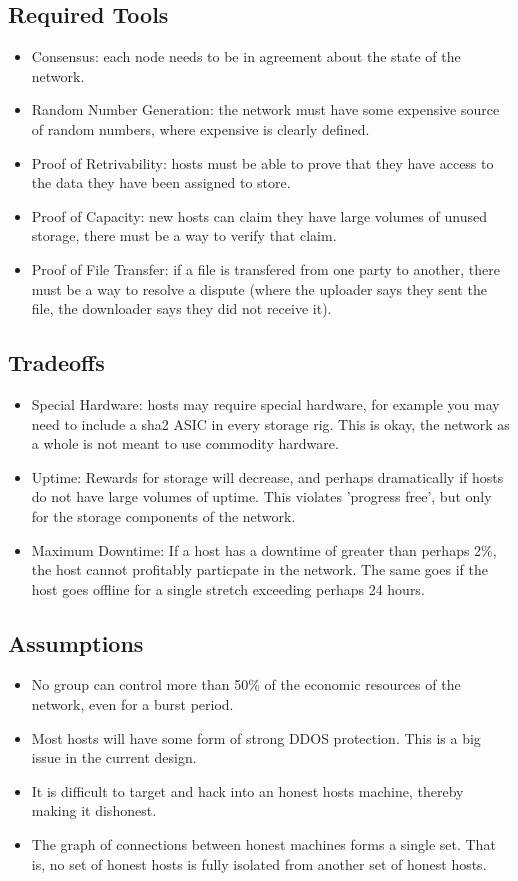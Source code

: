 \documentclass[twocolumn]{article}
\begin{document}
\subsection{Required Tools}
\begin{itemize}
	\item Consensus: each node needs to be in agreement about the state of the network.
	\item Random Number Generation: the network must have some expensive source of random numbers, where expensive is clearly defined.
	\item Proof of Retrivability: hosts must be able to prove that they have access to the data they have been assigned to store.
	\item Proof of Capacity: new hosts can claim they have large volumes of unused storage, there must be a way to verify that claim.
	\item Proof of File Transfer: if a file is transfered from one party to another, there must be a way to resolve a dispute (where the uploader says they sent the file, the downloader says they did not receive it).
\end{itemize}

\subsection{Tradeoffs}
\begin{itemize}
	\item Special Hardware: hosts may require special hardware, for example you may need to include a sha2 ASIC in every storage rig. This is okay, the network as a whole is not meant to use commodity hardware.
	\item Uptime: Rewards for storage will decrease, and perhaps dramatically if hosts do not have large volumes of uptime. This violates 'progress free', but only for the storage components of the network.
	\item Maximum Downtime: If a host has a downtime of greater than perhaps 2\%, the host cannot profitably particpate in the network. The same goes if the host goes offline for a single stretch exceeding perhaps 24 hours.
\end{itemize}

\subsection{Assumptions}
\begin{itemize}
	\item No group can control more than 50\% of the economic resources of the network, even for a burst period.
	\item Most hosts will have some form of strong DDOS protection. This is a big issue in the current design.
	\item It is difficult to target and hack into an honest hosts machine, thereby making it dishonest.
	\item The graph of connections between honest machines forms a single set. That is, no set of honest hosts is fully isolated from another set of honest hosts.
\end{itemize}
\end{document}
